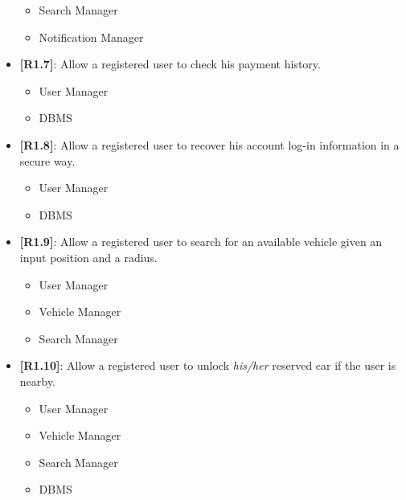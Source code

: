 \begin{itemize}
\begin{itemize}
	\item Search Manager
	\item Notification Manager\\
	\end{itemize}
	\item{\textbf{[R1.7]}}: Allow a registered user to check his payment history.
	\begin{itemize}
	\item User Manager
	\item DBMS\\
	\end{itemize}
	\item{\textbf{[R1.8]}}: Allow a registered user to recover his account log-in information in a secure way.
	\begin{itemize}
	\item User Manager
	\item DBMS\\
	\end{itemize}
	\item{\textbf{[R1.9]}}: Allow a registered user to search for an available vehicle given an input position and a radius.
	\begin{itemize}
	\item User Manager
	\item Vehicle Manager
	\item Search Manager\\
	\end{itemize}
	\item{\textbf{[R1.10]}}: Allow a registered user to unlock \emph{his/her} reserved car if the user is nearby.
	\begin{itemize}
	\item User Manager
	\item Vehicle Manager
	\item Search Manager
	\item DBMS\\
	\end{itemize}
\end{itemize}

